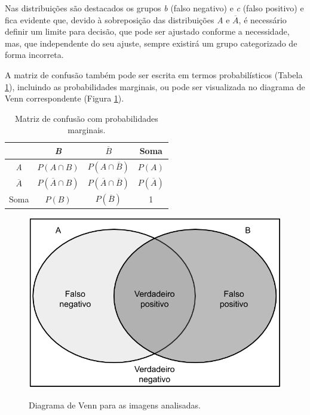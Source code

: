 Nas distribuições são destacados os grupos \textit{b} (falso negativo) e \textit{c} (falso positivo) e fica evidente que, devido à sobreposição das distribuições \textit{A} e $\overline{A}$, é necessário definir um limite para decisão, que pode ser ajustado conforme a necessidade, mas, que independente do seu ajuste, sempre existirá um grupo categorizado de forma incorreta.

A matriz de confusão também pode ser escrita em termos probabilísticos (Tabela \ref{tab:matriz_de_confusao_probab}), incluindo as probabilidades marginais, ou pode ser visualizada no diagrama de Venn correspondente (Figura \ref{fig:venn_diagram}).

\begin{table}[htbp]
    \caption{Matriz de confusão com probabilidades marginais.}
    \label{tab:matriz_de_confusao_probab}
    \centering
    \renewcommand{\arraystretch}{1.4}
    \begin{tabular}{c|cc|c}\hline\hline
                       & \textit{B}               & $\overline{B}$                      & Soma              \\
        \hline
        \textit{A}     & $P(A \cap B)$            & $P(A \cap \overline{B})$            & $P(A)$            \\
        $\overline{A}$ & $P(\overline{A} \cap B)$ & $P(\overline{A} \cap \overline{B})$ & $P(\overline{A})$ \\
        \hline
        Soma           & $P(B)$                   & $P(\overline{B})$                   & 1                 \\
        \hline\hline
    \end{tabular}
\end{table}

\begin{figure}[htb]
    \centering
    \caption{Diagrama de Venn para as imagens analisadas.}
    \includegraphics[scale=.4]{figs/venn-diagram.png}
    \label{fig:venn_diagram}
\end{figure}

